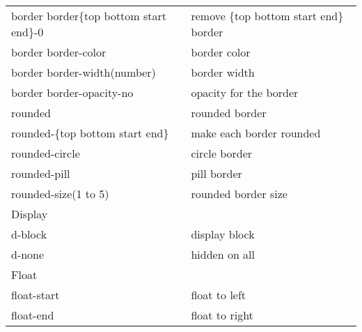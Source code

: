 \documentclass{article}
\begin{document}
\begin{longtable}{ll}
			border border\{top bottom start end\}-0     & remove \{top bottom start end\} border                                          \\
			border border-color                         & border color                                                                    \\
			border border-width(number)                 & border width                                                                    \\
			border border-opacity-no                    & opacity for the border                                                          \\
			rounded                                     & rounded border                                                                  \\
			rounded-\{top bottom start end\}            & make each border rounded                                                        \\
			rounded-circle                              & circle border                                                                   \\
			rounded-pill                                & pill border                                                                     \\
			rounded-size(1 to 5)                        & rounded border size                                                             \\ \hline
			Display                                     &                                                                                 \\ \hline
			d-block                                     & display block                                                                   \\
			d-none                                      & hidden on all                                                                   \\ \hline
			Float                                       &                                                                                 \\ \hline
			float-start                                 & float to left                                                                   \\
			float-end                                   & float to right                                                                  \\

\end{longtable}
\end{document}
